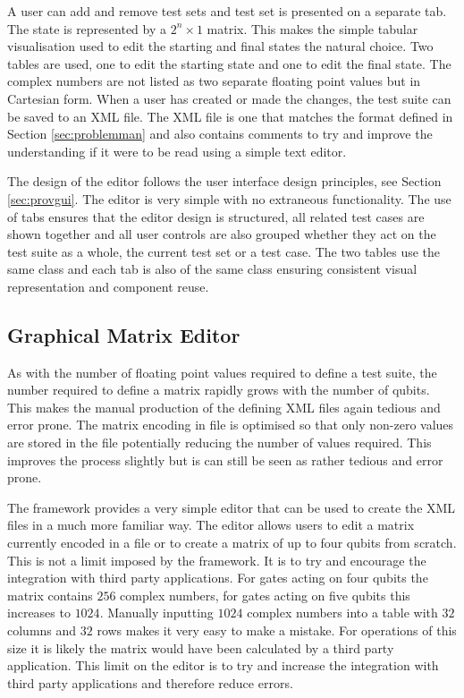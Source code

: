 A user can add and remove test sets and test set is presented on a separate tab.
The state is represented by a $2^n\times{1}$ matrix.
This makes the simple tabular visualisation used to edit the starting and final states the natural choice.
Two tables are used, one to edit the starting state and one to edit the final state.
The complex numbers are not listed as two separate floating point values but in Cartesian form.
When a user has created or made the changes, the test suite can be saved to an XML file.
The XML file is one that matches the format defined in Section \ref{sec:problemman} and also contains comments to try and improve the understanding if it were to be read using a simple text editor.

The design of the editor follows the user interface design principles, see Section \ref{sec:provgui}.
The editor is very simple with no extraneous functionality.
The use of tabs ensures that the editor design is structured, all related test cases are shown together and all user controls are also grouped whether they act on the test suite as a whole, the current test set or a test case.
The two tables use the same class and each tab is also of the same class ensuring consistent visual representation and component reuse.

\subsection{Graphical Matrix Editor}
\label{sec:indmatrixeditor}
As with the number of floating point values required to define a test suite, the number required to define a matrix rapidly grows with the number of qubits.
This makes the manual production of the defining XML files again tedious and error prone.
The matrix encoding in file is optimised so that only non-zero values are stored in the file potentially reducing the number of values required.
This improves the process slightly but is can still be seen as rather tedious and error prone.

The framework provides a very simple editor that can be used to create the XML files in a much more familiar way.
The editor allows users to edit a matrix currently encoded in a file or to create a matrix of up to four qubits from scratch.
This is not a limit imposed by the framework.
It is to try and encourage the integration with third party applications.
For gates acting on four qubits the matrix contains $256$ complex numbers, for gates acting on five qubits this increases to $1024$.
Manually inputting $1024$ complex numbers into a table with $32$ columns and $32$ rows makes it very easy to make a mistake.
For operations of this size it is likely the matrix would have been calculated by a third party application.
This limit on the editor is to try and increase the integration with third party applications and therefore reduce errors.

